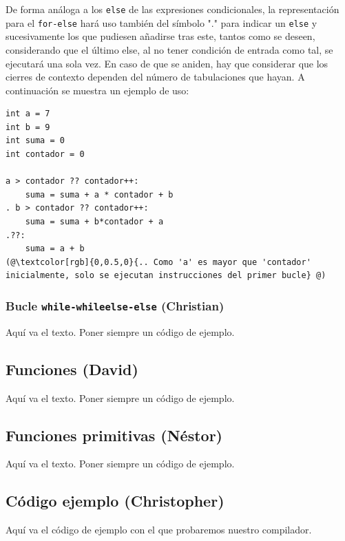 \documentclass[11pt, english]{article}
\begin{document}
De forma análoga a los \texttt{else} de las expresiones condicionales, la representación para el \texttt{for-else} hará uso también del símbolo "." para indicar un \texttt{else} y sucesivamente los que pudiesen añadirse tras este, tantos como se deseen, considerando que el último else, al no tener condición de entrada como tal, se ejecutará una sola vez. En caso de que se aniden, hay que considerar que los cierres de contexto dependen del número de tabulaciones que hayan. A continuación se muestra un ejemplo de uso:
\begin{lstlisting}[frame=single]
int a = 7
int b = 9
int suma = 0
int contador = 0

a > contador ?? contador++:
	suma = suma + a * contador + b
. b > contador ?? contador++:
	suma = suma + b*contador + a
.??:
	suma = a + b	
(@\textcolor[rgb]{0,0.5,0}{.. Como 'a' es mayor que 'contador' inicialmente, solo se ejecutan instrucciones del primer bucle} @)
\end{lstlisting}

\subsubsection{Bucle \texttt{while-whileelse-else} (Christian)}
Aquí va el texto. Poner siempre un código de ejemplo.


\subsection{Funciones (David)}
Aquí va el texto. Poner siempre un código de ejemplo.
\newpage

\subsection{Funciones primitivas (Néstor)}
Aquí va el texto. Poner siempre un código de ejemplo.
\newpage

\subsection{Código ejemplo (Christopher)}
Aquí va el código de ejemplo con el que probaremos nuestro compilador.
\end{document}
